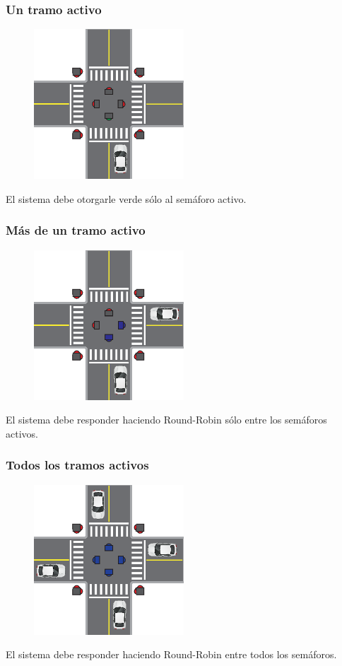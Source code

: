 \begin{frame}
\frametitle{Un tramo activo}
\begin{figure}[htbp]
	\centering
	\includegraphics[width=0.50\textwidth]{diagramas/un-activo.eps}
\end{figure}
El sistema debe otorgarle verde sólo al semáforo activo.
\end{frame}

\begin{frame}
\frametitle{Más de un tramo activo}
\begin{figure}[htbp]
	\centering
	\includegraphics[width=0.50\textwidth]{diagramas/dos-activos.eps}
\end{figure}
El sistema debe responder haciendo Round-Robin sólo entre los semáforos activos.
\end{frame}

\begin{frame}
\frametitle{Todos los tramos activos}
\begin{figure}[htbp]
	\centering
	\includegraphics[width=0.50\textwidth]{diagramas/todos-activos.eps}
\end{figure}
El sistema debe responder haciendo Round-Robin entre todos los semáforos.
\end{frame}

